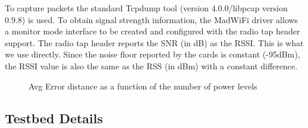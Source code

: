 To capture packets the standard Tcpdump tool (version 4.0.0/libpcap version 0.9.8) is used. To obtain signal strength information, the MadWiFi driver allows a
monitor mode interface to be created and configured with the radio tap header support. 
The radio tap header reports the SNR (in dB) as the RSSI. This is what we use directly. 
Since the noise floor reported by the cards is constant (-95dBm), the RSSI value 
is also the same as the RSS (in dBm) with a constant difference. 


\begin{figure}
	\centering
	\caption{Avg Error distance as a function of the number of power levels}
	\label{fig:powerlevelsvserrordistance}
\end{figure}

\subsection{Testbed Details}
\label{subsec:testbeddetails}

